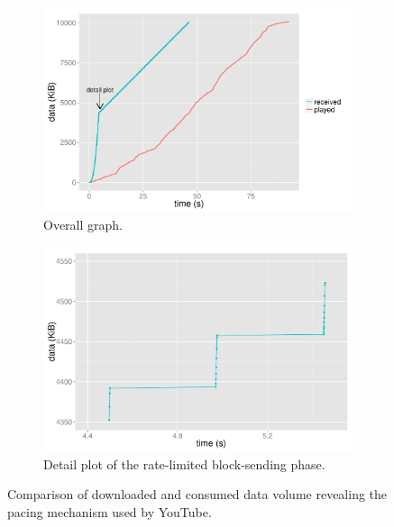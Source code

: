 \begin{figure}[htbp]
    \centering
        \begin{subfigure}[b]{0.90\textwidth}
                \centering
                \includegraphics[width=\textwidth]{images/R-blocktransfer.pdf}
                \caption{Overall graph.}
                \label{c3:fig:blocktransfer-overall}
        \end{subfigure}

        \begin{subfigure}[b]{0.90\textwidth}
                \centering
                \includegraphics[width=\textwidth]{images/R-blocktransferdetail.pdf}
                \caption{Detail plot of the rate-limited block-sending phase.}
                \label{c3:fig:blocktransfer-detail}
        \end{subfigure}
\caption{Comparison of downloaded and consumed data volume revealing the pacing mechanism used by YouTube.}
\label{c3:fig:blocktransfer}
\end{figure}


